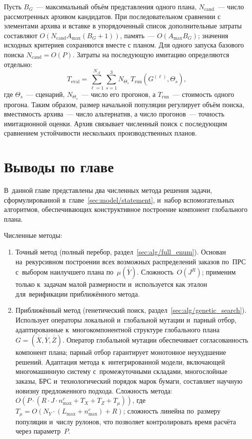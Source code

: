 Пусть $B_G$~--- максимальный объём представления одного плана, $N_{\mathrm{cand}}$~--- число рассмотренных архивом кандидатов. При последовательном сравнении с элементами архива и вставке в упорядоченный список дополнительные затраты составляют $O(N_{\mathrm{cand}}A_{\max}(B_G+1))$, память~--- $O(A_{\max}B_G)$; значения исходных критериев сохраняются вместе с планом. Для одного запуска базового поиска $N_{\mathrm{cand}}=O(P)$. Затраты на последующую имитацию определяются отдельно:
\[
  T_{\mathrm{eval}}=\sum_{\ell=1}^{N_{\mathcal A}}\sum_{s=1}^{3}
  N_{\Theta_s}\,T_{\mathrm{run}}(G^{(\ell)},\Theta_s),
\]
где $\Theta_s$~--- сценарий, $N_{\Theta_s}$~--- число его прогонов, а $T_{\mathrm{run}}$~--- стоимость одного прогона. Таким образом, размер начальной популяции регулирует объём поиска, вместимость архива~--- число альтернатив, а число прогонов~--- точность имитационной оценки. Архив связывает численный поиск с последующим сравнением устойчивости нескольких производственных планов.

\section{Выводы по главе}\label{sec:alg/conclusion}

В~данной главе представлены два численных метода решения задачи, сформулированной в~главе~\ref{sec:model/statement}, и~набор вспомогательных алгоритмов, обеспечивающих конструктивное построение компонент глобального плана.

\noindent Численные методы:
\begin{enumerate}
    \item Точный метод (полный перебор, раздел~\ref{sec:alg/full_enum}).
    Основан на~рекурсивном построении всех возможных распределений заказов по~ПРС с~выбором наилучшего плана по~$\mu(\overline{\overline{Y}})$.
    Сложность~$O(J^R)$; применим только к~задачам малой размерности и~используется как эталон для~верификации приближённого метода.
    \item Приближённый метод (генетический поиск, раздел~\ref{sec:alg/genetic_search}).
    Использует операторы локальной и~глобальной мутации и~парный отбор, адаптированные к~многокомпонентной структуре глобального плана $G=(\overline{\overline{X}},\overline{\overline{Y}},\overline{\overline{Z}})$.
    Оператор глобальной мутации обеспечивает согласованность компонент плана; парный отбор гарантирует монотонное неухудшение решений.
    Адаптация метода к~интегрированной модели, включающей многомашинную систему с~промежуточными складами, многослойные заказы, БРС и~технологический порядок марок бумаги, составляет научную новизну предложенного подхода.
    Сложность метода: $O(P\cdot(R\cdot J\cdot n^c_{\max}+T_X+T_Z+T_\mu))$, где $T_\mu=O(N_Y\cdot(L_{\max}+n^c_{\max})+R)$; сложность линейна по~размеру популяции и~числу рулонов, что позволяет контролировать время расчёта через параметр~$P$.
\end{enumerate}

